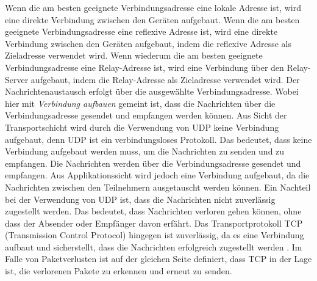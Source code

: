 Wenn die am besten geeignete Verbindungsadresse eine lokale Adresse ist, wird eine direkte Verbindung zwischen den Geräten aufgebaut. Wenn die am besten geeignete Verbindungsadresse eine reflexive Adresse ist, wird eine direkte Verbindung zwischen den Geräten aufgebaut, indem die reflexive Adresse als Zieladresse verwendet wird. Wenn wiederum die am besten geeignete Verbindungsadresse eine Relay-Adresse ist, wird eine Verbindung über den Relay-Server aufgebaut, indem die Relay-Adresse als Zieladresse verwendet wird. Der Nachrichtenaustausch erfolgt über die ausgewählte Verbindungsadresse. Wobei hier mit \textit{Verbindung aufbauen} gemeint ist, dass die Nachrichten über die Verbindungsadresse gesendet und empfangen werden können. Aus Sicht der Transportschicht wird durch die Verwendung von UDP keine Verbindung aufgebaut, denn UDP ist ein verbindungsloses Protokoll. Das bedeutet, dass keine Verbindung aufgebaut werden muss, um die Nachrichten zu senden und zu empfangen. Die Nachrichten werden über die Verbindungsadresse gesendet und empfangen. Aus Applikationssicht wird jedoch eine Verbindung aufgebaut, da die Nachrichten zwischen den Teilnehmern ausgetauscht werden können.
Ein Nachteil bei der Verwendung von UDP ist, dass die Nachrichten nicht zuverlässig zugestellt werden. Das bedeutet, dass Nachrichten verloren gehen können, ohne dass der Absender oder Empfänger davon erfährt. Das Transportprotokoll TCP (Transmission Control Protocol) hingegen ist zuverlässig, da es eine Verbindung aufbaut und sicherstellt, dass die Nachrichten erfolgreich zugestellt werden \parencite[S. 36]{rfc9293_TCP}. Im Falle von Paketverlusten ist auf der gleichen Seite definiert, dass TCP in der Lage ist, die verlorenen Pakete zu erkennen und erneut zu senden.

